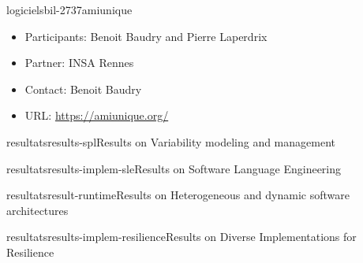\documentclass{ra2018}
\begin{document}
\begin{module}{logiciels}{bil-2737}{amiunique}
 	\begin{itemize}
 		\item Participants: Benoit Baudry and Pierre Laperdrix
 		\item Partner: INSA Rennes
 		\item Contact: Benoit Baudry
 		\item URL: \url{https://amiunique.org/}
 	\end{itemize}
 	
 \end{module}






\begin{module}{resultats}{results-spl}{Results on Variability modeling and management}
	\label{sec:results-spl}

	
\end{module}

\begin{module}{resultats}{results-implem-sle}{Results on Software Language
		Engineering}
	\label{sec:results-sle}
	
\end{module}

\begin{module}{resultats}{result-runtime}{Results on Heterogeneous and dynamic software architectures}
	\label{sec:results-runtime}
	
\end{module}

\begin{module}{resultats}{results-implem-resilience}{Results on Diverse
		Implementations for Resilience}
	\label{sec:results-implem}
	
\end{module}

\end{document}
